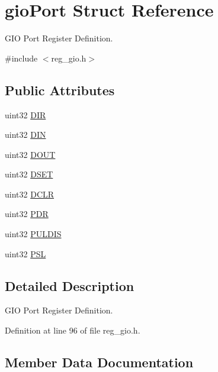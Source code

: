 \hypertarget{structgioPort}{}\section{gio\+Port Struct Reference}
\label{structgioPort}


G\+IO Port Register Definition.  




{\ttfamily \#include $<$reg\+\_\+gio.\+h$>$}

\subsection*{Public Attributes}
\begin{DoxyCompactItemize}
\item 
uint32 \mbox{\hyperlink{structgioPort_a1f1a5295bf3ad0455785999aa4c4ac1b}{D\+IR}}
\item 
uint32 \mbox{\hyperlink{structgioPort_a030ab5436eb43138b1cb24a9fb722db0}{D\+IN}}
\item 
uint32 \mbox{\hyperlink{structgioPort_a2a53ae1c23a10b5fc826b78a38927160}{D\+O\+UT}}
\item 
uint32 \mbox{\hyperlink{structgioPort_a4cf17b67c320fb97fcb65bab69838b4c}{D\+S\+ET}}
\item 
uint32 \mbox{\hyperlink{structgioPort_afa989d52e06c43f976fae81a3dcc03cf}{D\+C\+LR}}
\item 
uint32 \mbox{\hyperlink{structgioPort_ab00723758dea485f173b09a6a50efbaa}{P\+DR}}
\item 
uint32 \mbox{\hyperlink{structgioPort_a71985cf7f14f11f0a4dff3dc91eee3e7}{P\+U\+L\+D\+IS}}
\item 
uint32 \mbox{\hyperlink{structgioPort_a4372c64b0ca6aed9e2908f6195cb6581}{P\+SL}}
\end{DoxyCompactItemize}


\subsection{Detailed Description}
G\+IO Port Register Definition. 

Definition at line 96 of file reg\+\_\+gio.\+h.



\subsection{Member Data Documentation}
\mbox{\label{structgioPort_afa989d52e06c43f976fae81a3dcc03cf}} 

